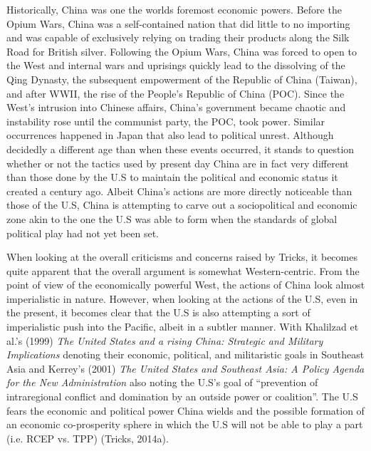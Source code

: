 \documentclass[man,donotrepeattitle,letter]{apa6}
\begin{document}
Historically, China was one the worlds foremost economic powers.  Before the Opium Wars, China was a self-contained nation that did little to no importing and was capable of exclusively relying on trading their products along the Silk Road for British silver.  Following the Opium Wars, China was forced to open to the West and internal wars and uprisings quickly lead to the dissolving of the Qing Dynasty, the subsequent empowerment of the Republic of China (Taiwan), and after WWII, the rise of the People's Republic of China (POC).  Since the West's intrusion into Chinese affairs, China's government became chaotic and instability rose until the communist party, the POC, took power. Similar occurrences happened in Japan that also lead to political unrest. Although decidedly a different age than when these events occurred, it stands to question whether or not the tactics used by present day China are in fact very different than those done by the U.S to maintain the political and economic status it created a century ago. Albeit China's actions are more directly noticeable than those of the U.S, China is attempting to carve out a sociopolitical and economic zone akin to the one the U.S was able to form when the standards of global political play had not yet been set.

When looking at the overall criticisms and concerns raised by Tricks, it becomes quite apparent that the overall argument is somewhat Western-centric.  From the point of view of the economically powerful West, the actions of China look almost imperialistic in nature.  However, when looking at the actions of the U.S, even in the present, it becomes clear that the U.S is also attempting a sort of imperialistic push into the Pacific, albeit in a subtler manner. With Khalilzad et al.'s (1999) \textit{The United States and a rising China: Strategic and Military Implications} denoting their economic, political, and militaristic goals in Southeast Asia and Kerrey's (2001) \textit{The United States and Southeast Asia: A Policy Agenda for the New Administration} also noting the U.S's goal of ``prevention of intraregional conflict and domination by an outside power or coalition''.  The U.S fears the economic and political power China wields and the possible formation of an economic co-prosperity sphere in which the U.S will not be able to play a part (i.e. RCEP vs. TPP) (Tricks, 2014a).
\end{document}
